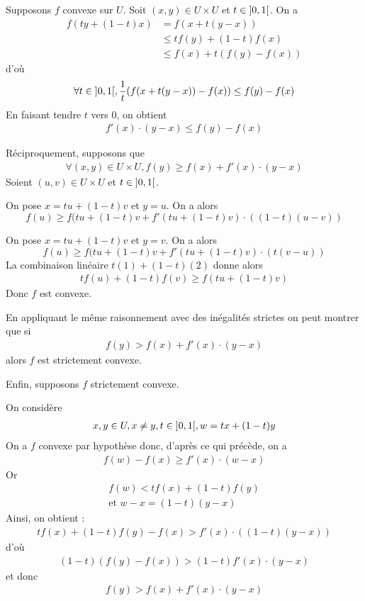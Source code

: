 \documentclass[french,a4paper,10pt]{article}
\begin{document}
	\begin{myproof}
		Supposons $f$ convexe sur $U$. Soit $(x,y)\in U\times U$ et $t\in\mathopen{]}0, 1\mathclose{[}$. On a
			\[\begin{aligned}
				f(ty+(1-t)x)&=f(x+t(y-x))\\
				&\le tf(y)+(1-t)f(x)\\
				&\le f(x)+t(f(y)-f(x))
			\end{aligned}\]
		d'où
			\[\begin{aligned}
				\forall t\in\mathopen{]}0, 1\mathclose{[},\frac1t(f(x+t(y-x))-f(x))\le f(y)-f(x)
			\end{aligned}\]
		En faisant tendre $t$ vers 0, on obtient
			\[\begin{aligned}
				f'(x)\cdot(y-x)\le f(y)-f(x)
			\end{aligned}\]
			
		Réciproquement, supposons que
			\[\begin{aligned}
				\forall (x,y)\in U\times U,f(y)\ge f(x)+f'(x)\cdot(y-x)
			\end{aligned}\]
		Soient $(u,v)\in U\times U$ et $t\in\mathopen{]}0,1\mathclose{[}$.
		
		On pose $x=tu+(1-t)v$ et $y=u$. On a alors
			\[\label{eq1}
			f(u)\ge f(tu+(1-t)v+f'(tu+(1-t)v)\cdot((1-t)(u-v))\tag{1}
			\]
			
		On pose $x=tu+(1-t)v$ et $y=v$. On a alors
			\[\label{eq2}
			f(u)\ge f(tu+(1-t)v+f'(tu+(1-t)v)\cdot(t(v-u))\tag{2}
			\]
		La combinaison linéaire $t\hyperref[eq1]{(1)}+(1-t)\hyperref[eq2]{(2)}$ donne alors 
			\[\begin{aligned}
				tf(u)+(1-t)f(v)\ge f(tu+(1-t)v)
			\end{aligned}\]
		Donc $f$ est convexe.
		
		En appliquant le même raisonnement avec des inégalités strictes on peut montrer que si
			\[\begin{aligned}
				f(y)>f(x)+f'(x)\cdot(y-x)
			\end{aligned}\]
		alors $f$ est strictement convexe.
		
		Enfin, supposons $f$ strictement convexe.
		
		On considère 
			\[\begin{aligned}
				x,y\in U,x\ne y,t\in\mathopen{]}0, 1\mathclose{[},w=tx+(1-t)y
			\end{aligned}\]
		On a $f$ convexe par hypothèse donc, d'après ce qui précède, on a
			\[\begin{aligned}
				f(w)-f(x)\ge f'(x)\cdot (w-x)
			\end{aligned}\]
		Or 
			\[\begin{gathered}
				f(w)< tf(x)+(1-t)f(y)\\
				\text{et }w-x=(1-t)(y-x)
			\end{gathered}\]
		Ainsi, on obtient :
			\[\begin{aligned}
				tf(x)+(1-t)f(y)-f(x)>f'(x)\cdot((1-t)(y-x))
			\end{aligned}\]
		d'où
			\[\begin{aligned}
				(1-t)(f(y)-f(x))>(1-t)f'(x)\cdot(y-x)
			\end{aligned}\]
		et donc
			\[\begin{aligned}
				f(y)>f(x)+f'(x)\cdot(y-x)
			\end{aligned}\]
	\end{myproof}
\end{document}
